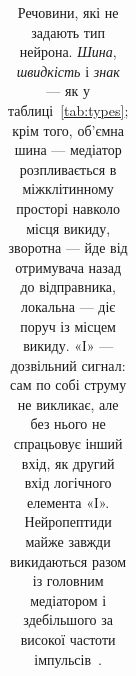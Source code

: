 \begin{table}[t]
\begin{tabular}{>{\raggedright}p{2.25cm}>{\raggedright}p{2.8cm}>{\raggedright}p{1.8cm}>{\raggedright}p{1.5cm}>{\centering}p{0.8cm}>{\raggedright\arraybackslash}p{4.3cm}}
\bottomrule
\end{tabular}
\caption{Речовини, які не задають тип нейрона. \emph{Шина}, \emph{швидкість} і \emph{знак} --- як у таблиці~\ref{tab:types}; крім того, об'ємна шина --- медіатор розпливається в міжклітинному просторі навколо місця викиду, зворотна --- йде від отримувача назад до відправника, локальна --- діє поруч із місцем викиду. «І» --- дозвільний сигнал: сам по собі струму не викликає, але без нього не спрацьовує інший вхід, як другий вхід логічного елемента «І». Нейропептиди майже завжди викидаються разом із головним медіатором і здебільшого за високої частоти імпульсів~\cite{vandenPol2012}.}
\label{tab:othermediators}
\end{table}
